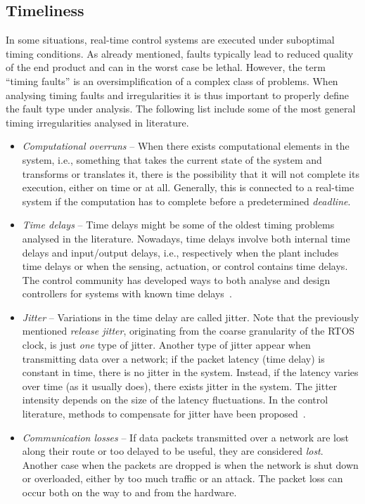\subsection{Timeliness}%
\label{sec:intro:timeliness}%
%
In some situations, real-time control systems are executed under suboptimal timing conditions.
As already mentioned, faults typically lead to reduced quality of the end product and can in the worst case be lethal.
However, the term ``timing faults'' is an oversimplification of a complex class of problems.
When analysing timing faults and irregularities it is thus important to properly define the fault type under analysis.
The following list include some of the most general timing irregularities analysed in literature.
%
\begin{itemize}
    \item \emph{Computational overruns} -- When there exists computational elements in the system, i.e., something that takes the current state of the system and transforms or translates it, there is the possibility that it will not complete its execution, either on time or at all. %
        Generally, this is connected to a real-time system if the computation has to complete before a predetermined \emph{deadline}.

    \item \emph{Time delays} -- Time delays might be some of the oldest timing problems analysed in the literature.
        Nowadays, time delays involve both internal time delays and input/output delays, i.e., respectively when the plant includes time delays or when the sensing, actuation, or control contains time delays.
        The control community has developed ways to both analyse and design controllers for systems with known time delays~\cite{Mirkin:2004, Mirkin:2005}.

    \item \emph{Jitter} -- Variations in the time delay are called jitter.
        Note that the previously mentioned \emph{release jitter}, originating from the coarse granularity of the RTOS clock, is just \emph{one} type of jitter.
        Another type of jitter appear when transmitting data over a network; if the packet latency (time delay) is constant in time, there is no jitter in the system.
        Instead, if the latency varies over time (as it usually does), there exists jitter in the system.
        The jitter intensity depends on the size of the latency fluctuations.
        In the control literature, methods to compensate for jitter have been proposed~\cite{Cervin:2004}.

    \item \emph{Communication losses} -- If data packets transmitted over a network are lost along their route or too delayed to be useful, they are considered \emph{lost}.
        Another case when the packets are dropped is when the network is shut down or overloaded, either by too much traffic or an attack.
        The packet loss can occur both on the way to and from the hardware.
\end{itemize}
